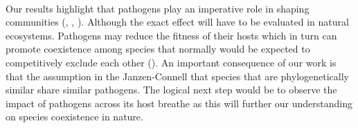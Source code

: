 \documentclass{article}
\begin{document}
\paragraph{}Our results highlight that pathogens play an imperative role in shaping communities (\citep{Janzen1970}, \citep{Connell1978}, \citep{Bush1997}). Although the exact effect will have to be evaluated in natural ecosystems. Pathogens may reduce the fitness of their hosts which in turn can promote coexistence among species that normally would be expected to competitively exclude each other (\citep{Spear2018}). An important consequence of our work is that the assumption in the Janzen-Connell that species that are phylogenetically similar share similar pathogens. The logical next step would be to observe the impact of pathogens across its host breathe as this will further our understanding on species coexistence in nature. 



\end{document}

